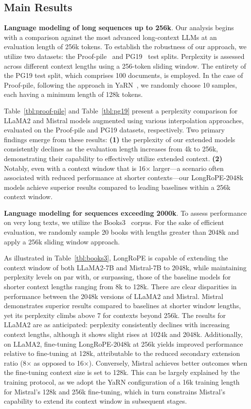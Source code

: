\subsection{Main Results}

\label{sec:mainresult}
\textbf{Language modeling of long sequences up to 256k}. Our analysis begins with a comparison against the most advanced long-context LLMs at an evaluation length of 256k tokens. To establish the robustness of our approach, we utilize two datasets: the Proof-pile~\cite{pg19} and PG19~\cite{pile} test splits. Perplexity is assessed across different context lengths using a 256-token sliding window. The entirety of the PG19 test split, which comprises 100 documents, is employed. In the case of Proof-pile, following the approach in YaRN~\cite{yarn}, we randomly choose 10 samples, each having a minimum length of 128k tokens.

Table~\ref{tbl:proof-pile} and Table~\ref{tbl:pg19} present a perplexity comparison for LLaMA2 and Mistral models augmented using various interpolation approaches, evaluated on the Proof-pile and PG19 datasets, respectively. Two primary findings emerge from these results: \textbf{(1)} the perplexity of our extended models consistently declines as the evaluation length increases from 4k to 256k, demonstrating their capability to effectively utilize extended context. \textbf{(2)} Notably, even with a context window that is 16$\times$ larger—a scenario often associated with reduced performance at shorter contexts—our LongRoPE-2048k models achieve superior results compared to leading baselines within a 256k context window.

\textbf{Language modeling for sequences exceeding 2000k}. To assess performance on very long texts, we utilize the Books3~\cite{pile} corpus. For the sake of efficient evaluation, we randomly sample 20 books with lengths greater than 2048k and apply a 256k sliding window approach.

As illustrated in Table~\ref{tbl:books3}, LongRoPE is capable of extending the context window of both LLaMA2-7B and Mistral-7B to 2048k, while maintaining perplexity levels on par with, or surpassing, those of the baseline models for shorter context lengths ranging from 8k to 128k. There are clear disparities in performance between the 2048k versions of LLaMA2 and Mistral. Mistral demonstrates superior results compared to baselines at shorter window lengths, yet its perplexity climbs above 7 for contexts beyond 256k. The results for LLaMA2 are as anticipated: perplexity consistently declines with increasing context lengths, although it shows slight rises at 1024k and 2048k. Additionally, on LLaMA2, fine-tuning LongRoPE-2048k at 256k yields improved performance relative to fine-tuning at 128k, attributable to the reduced secondary extension ratio (8$\times$ as opposed to 16$\times$). Conversely, Mistral achieves better outcomes when the fine-tuning context size is set to 128k. This can be largely explained by the training protocol, as we adopt the YaRN configuration of a 16k training length for Mistral's 128k and 256k fine-tuning, which in turn constrains Mistral’s capability to extend its context window in subsequent stages.

